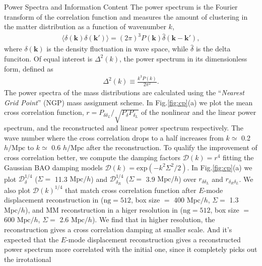 \begin{section}{Power Spectra and Information Content}
  \label{sec:fisherinfo}
  The power spectrum is the Fourier transform of the correlation
  function and measures the amount of clustering in the matter
  distribution as a function of wavenumber $k$,
  \begin{align}
    \langle \delta \left( \bm{k} \right) \delta \left( \bm{k'}\right) \rangle =
    \left( 2\pi \right) ^3 P \left( \bm{k} \right) \hat{\delta} \left( \bm{k}-\bm{k'} \right),
  \end{align}
  where $\delta \left( \bm{k} \right)$ is the density fluctuation in
  wave space, while $\hat{\delta}$ is the delta funciton. Of equal
  interest is $\Delta ^2(k)$, the power spectrum in its dimensionless
  form, defined as
  \begin{align}
    \Delta ^2(k) \equiv \frac{k^3 P \left( k \right)}{2\pi ^2}.
  \end{align}
  The power spectra of the mass distributions are calculated using the
  \enquote{\textit{Nearest Grid Point}} (NGP) mass assignment scheme.
  In Fig.\ref{fig:cp}(a) we plot the mean cross correlation function,
  $r=P_{\delta \delta_L}/\sqrt{P_\delta P_{\delta_L}}$ of the
  nonlinear and the linear power spectrum, and the reconstructed and
  linear power spectrum respectively.  The wave number where the cross
  correlation drops to a half increases from $k\simeq$ 0.2
  $h/\mathrm{Mpc}$ to $k \simeq$ 0.6 $h/\mathrm{Mpc}$ after the
  reconstruction.  To qualify the improvement of cross correlation
  better, we compute the damping factors $\mathcal{D}(k)=r^4$ fitting
  the Gaussian BAO damping models
  $\mathcal{D}(k)=\mathrm{exp}(-k^2 \Sigma^2/2)$.  In
  Fig.\ref{fig:cp}(a) we plot $\mathcal{D}_\delta^{1/4}$ ($\Sigma =$
  11.3 $\mathrm{Mpc}/h$) and $\mathcal{D}_{\delta_R}^{1/4}$
  ($\Sigma = $ 3.9 $\mathrm{Mpc}/h$) over $r_{\delta\delta_L}$ and
  $r_{\delta_R\delta_L}$.  We also plot $\mathcal{D}(k)^{1/4}$ that
  match cross correlation function after $E$-mode displacement
  reconstruction in \cite{bib:Yu2016} ($\mathrm{ng}=512$, box size $=$
  400 $\mathrm{Mpc}/h$, $\Sigma =$ 1.3 $\mathrm{Mpc}/h$), and MM
  reconstruction in a higer resolution in \cite{bib:ZhuH2016}
  ($\mathrm{ng}=512$, box size $=$ 600 $\mathrm{Mpc}/h$, $\Sigma =$
  2.6 $\mathrm{Mpc}/h$).  We find that in higher resolution, the
  reconstruction gives a cross correlation damping at smaller scale.
  And it's expected that the $E$-mode displacement reconstruction
  gives a reconstructed power spectrum more correlated with the
  initial one, since it completely picks out the irrotational

\end{section}
